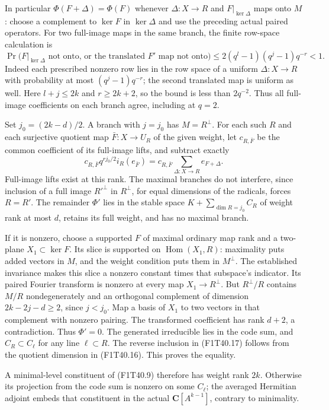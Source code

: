 In particular \(\Phi(F+\Delta)=\Phi(F)\) whenever
\(\Delta:X\to R\) and \(F|_{\ker\Delta}\) maps onto
\(M\): choose a complement to \(\ker F\) in
\(\ker\Delta\) and use the preceding actual paired
operators. For two full-image maps in the same branch,
the finite row-space calculation is
\[
 \Pr\bigl(F|_{\ker\Delta}\text{ not onto, or the
                  translated }F'\text{ map not onto}\bigr)
 \le2(q^l-1)(q^j-1)q^{-r}<1.
 \tag{F1T40.19}
\]
Indeed each prescribed nonzero row lies in the row space
of a uniform \(\Delta:X\to R\) with probability at
most \((q^j-1)q^{-r}\); the second translated map is
uniform as well. Here \(l+j\le2k\) and
\(r\ge2k+2\), so the bound is less than \(2q^{-2}\).
Thus all full-image coefficients on each branch agree,
including at \(q=2\).

Set \(j_0=(2k-d)/2\). A branch with \(j=j_0\) has
\(M=R^\perp\). For each such \(R\) and each
surjective quotient map \(\bar F:X\to U_R\) of the
given weight, let \(c_{R,\bar F}\) be the common
coefficient of its full-image lifts, and subtract exactly
\[
 c_{R,\bar F}q^{rj_0/2}i_R(e_{\bar F})
       =c_{R,\bar F}\sum_{\Delta:X\to R}e_{F+\Delta}.
 \tag{F1T40.20}
\]
Full-image lifts exist at this rank. The maximal branches
do not interfere, since inclusion of a full image
\(R'^\perp\) in \(R^\perp\), for equal dimensions of
the radicals, forces \(R=R'\).
The remainder \(\Phi'\) lies in the stable space
\(K+\sum_{\dim R=j_0}C_R\) of weight rank at most
\(d\), retains its full weight, and has no maximal branch.

If it is nonzero, choose a supported \(F\) of maximal
ordinary map rank and a two-plane \(X_1\subset\ker F\).
Its slice is supported on \(\operatorname{Hom}(X_1,R)\):
maximality puts added vectors in \(M\), and the weight
condition puts them in \(M^\perp\).
The established invariance makes this slice a nonzero
constant times that subspace's indicator. Its paired
Fourier transform is nonzero at every map
\(X_1\to R^\perp\). But \(R^\perp/R\) contains
\(M/R\) nondegenerately and an orthogonal complement
of dimension \(2k-2j-d\ge2\), since \(j<j_0\).
Map a basis of \(X_1\) to two vectors in that complement
with nonzero pairing. The transformed coefficient has
rank \(d+2\), a contradiction. Thus \(\Phi'=0\).
The generated irreducible lies in the code sum, and
\(C_R\subset C_\ell\) for any line \(\ell\subset R\).
The reverse inclusion in (F1T40.17) follows from the
quotient dimension in (F1T40.16). This proves the equality.

A minimal-level constituent of (F1T40.9) therefore has
weight rank \(2k\). Otherwise its projection from the
code sum is nonzero on some \(C_\ell\); the averaged
Hermitian adjoint embeds that constituent in the actual
\(\mathbf C[A^{k-1}]\), contrary to minimality.


